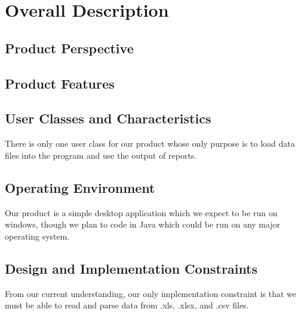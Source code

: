 \section{Overall Description}
%

\subsection{Product Perspective}

\subsection{Product Features}

\subsection{User Classes and Characteristics}
There is only one user class for our product whose only purpose is to load data files into the program and use the output of reports. 

\subsection{Operating Environment}
Our product is a simple desktop application which we expect to be run on windows, though we plan to code in Java which could be run on any major operating system. 

\subsection{Design and Implementation Constraints}
From our current understanding, our only implementation constraint is that we must be able to read and parse data from .xls, .xlsx, and .csv files. 

